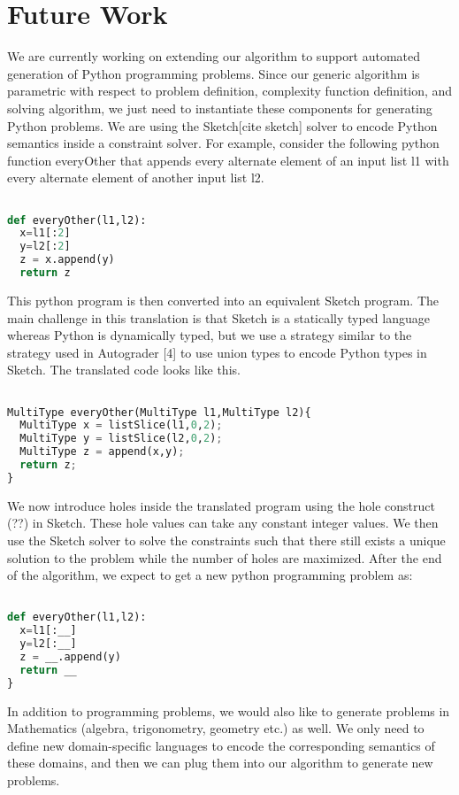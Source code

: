 \section{Future Work}

We are currently working on extending our algorithm to support automated generation of Python programming problems. Since our generic algorithm is parametric with respect to problem definition, complexity function definition, and solving algorithm, we just need to instantiate these components for generating Python problems. We are using the Sketch[cite sketch] solver to encode Python semantics inside a constraint solver. For example, consider the following python function everyOther that appends every alternate element of an input list l1 with every alternate element of another input list l2.

\begin{lstlisting}[language=Python]

def everyOther(l1,l2):
  x=l1[:2]
  y=l2[:2]
  z = x.append(y)
  return z

\end{lstlisting}

This python program is then converted into an equivalent Sketch program. The main challenge in this translation is that Sketch is a statically typed language whereas Python is dynamically typed, but we use a strategy similar to the strategy used in Autograder [4] to use union types to encode Python types in Sketch. The translated code looks like this.

\begin{lstlisting}[language=Python]

MultiType everyOther(MultiType l1,MultiType l2){
  MultiType x = listSlice(l1,0,2);
  MultiType y = listSlice(l2,0,2);
  MultiType z = append(x,y);
  return z;
}

\end{lstlisting}

We now introduce holes inside the translated program using the hole construct (??) in Sketch. These hole values can take any constant integer values. We then use the Sketch solver to solve the constraints such that there still exists a unique solution to the problem while the number of holes are maximized. After the end of the algorithm, we expect to get a new python programming problem as:

\begin{lstlisting}[language=Python]

def everyOther(l1,l2):
  x=l1[:__]
  y=l2[:__]
  z = __.append(y)
  return __
}
\end{lstlisting}

In addition to programming problems, we would also like to generate problems in Mathematics (algebra, trigonometry, geometry etc.) as well. We only need to define new domain-specific languages to encode the corresponding semantics of these domains, and then we can plug them into our algorithm to generate new problems.
